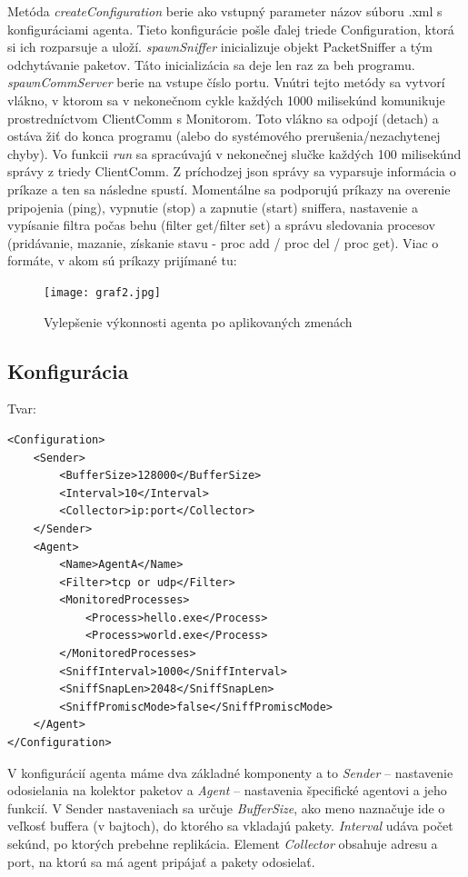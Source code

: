 \documentclass[a4paper,12pt]{article}
\begin{document}
Metóda \textit{createConfiguration} berie ako vstupný parameter názov súboru .xml s konfiguráciami agenta. Tieto konfigurácie pošle ďalej triede Configuration, ktorá si ich rozparsuje a uloží. \textit{spawnSniffer} inicializuje objekt PacketSniffer a tým odchytávanie paketov. Táto inicializácia sa deje len raz za beh programu. \textit{spawnCommServer} berie na vstupe číslo portu. Vnútri tejto metódy sa vytvorí vlákno, v ktorom sa v nekonečnom cykle každých 1000 milisekúnd komunikuje prostredníctvom ClientComm s Monitorom. Toto vlákno sa odpojí (detach) a ostáva žiť do konca programu (alebo do systémového prerušenia/nezachytenej chyby). Vo funkcii \textit{run} sa spracúvajú v nekonečnej slučke každých 100 milisekúnd správy z triedy ClientComm. Z príchodzej json správy sa vyparsuje informácia o príkaze a ten sa následne spustí. Momentálne sa podporujú príkazy na overenie pripojenia (ping), vypnutie (stop) a zapnutie (start) sniffera, nastavenie a vypísanie filtra počas behu (filter get/filter set) a správu sledovania procesov (pridávanie, mazanie, získanie stavu - proc add / proc del / proc get). Viac o formáte, v akom sú príkazy prijímané tu: \\

\begin{figure}[h!]
	\centering
	\label{graf1}
	\texttt{[image: graf2.jpg]}
	\caption{Vylepšenie výkonnosti agenta po aplikovaných zmenách}
\end{figure}

\subsection{Konfigurácia}

Tvar: \\ 
\begin{lstlisting}
<Configuration> 
	<Sender> 
		<BufferSize>128000</BufferSize> 
		<Interval>10</Interval> 
		<Collector>ip:port</Collector> 
	</Sender> 
	<Agent> 
		<Name>AgentA</Name> 
		<Filter>tcp or udp</Filter> 
		<MonitoredProcesses> 
			<Process>hello.exe</Process> 
			<Process>world.exe</Process> 
		</MonitoredProcesses> 
		<SniffInterval>1000</SniffInterval> 
		<SniffSnapLen>2048</SniffSnapLen> 
		<SniffPromiscMode>false</SniffPromiscMode> 
	</Agent> 
</Configuration> 
\end{lstlisting}

V konfigurácií agenta máme dva základné komponenty a to \textit{Sender} – nastavenie odosielania na kolektor paketov a \textit{Agent} – nastavenia špecifické agentovi a jeho funkcií.
V Sender nastaveniach sa určuje \textit{BufferSize}, ako meno naznačuje ide o veľkosť buffera (v bajtoch), do ktorého sa vkladajú pakety. \textit{Interval} udáva počet sekúnd, po ktorých prebehne replikácia. Element \textit{Collector} obsahuje adresu a port, na ktorú sa má agent pripájať a pakety odosielať. \\
\end{document}
